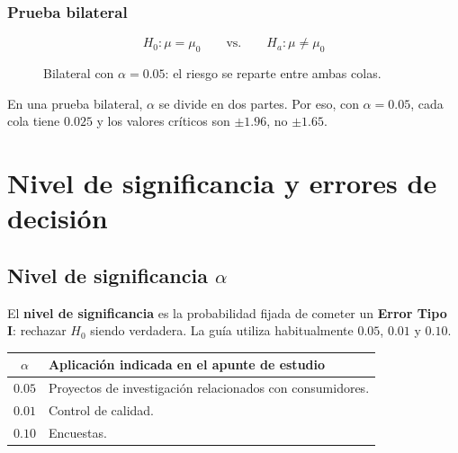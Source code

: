 \documentclass[11pt,a4paper]{article}
\begin{document}
\subsubsection{Prueba bilateral}
\[
H_0:\mu=\mu_0\qquad\text{vs.}\qquad H_a:\mu\neq\mu_0
\]
\begin{figure}[H]
\centering
{}
\caption{Bilateral con $\alpha=0.05$: el riesgo se reparte entre ambas colas.}
\end{figure}
\begin{observargrafico}
En una prueba bilateral, $\alpha$ se divide en dos partes. Por eso, con $\alpha=0.05$, cada cola tiene $0.025$ y los valores críticos son $\pm1.96$, no $\pm1.65$.
\end{observargrafico}

\section{Nivel de significancia y errores de decisión}

\subsection{Nivel de significancia $\alpha$}

El \textbf{nivel de significancia} es la probabilidad fijada de cometer un \textbf{Error Tipo I}: rechazar $H_0$ siendo verdadera. La guía utiliza habitualmente $0.05$, $0.01$ y $0.10$.

\begin{table}[H]
\centering
\begin{tabular}{cl}
\toprule
$\alpha$ & Aplicación indicada en el apunte de estudio \\
\midrule
$0.05$ & Proyectos de investigación relacionados con consumidores.\\
$0.01$ & Control de calidad.\\
$0.10$ & Encuestas.\\
\bottomrule
\end{tabular}
\end{table}
\end{document}
